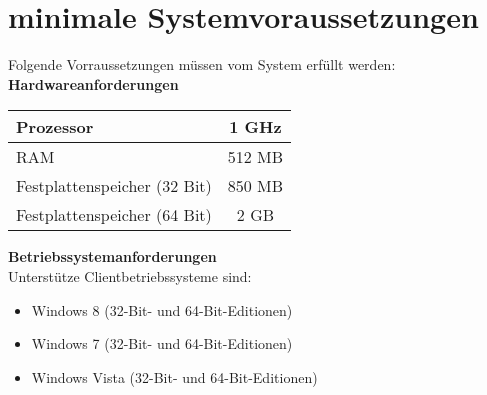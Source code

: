 \chapter{minimale Systemvoraussetzungen}
Folgende Vorraussetzungen müssen vom System erfüllt werden:\\
\textbf{Hardwareanforderungen}
\begin{center}
\begin{tabular}{ | l | c |}\hline 
Prozessor & 1 GHz \\ \hline
RAM & 512 MB \\ \hline
Festplattenspeicher (32 Bit) & 850 MB \\ \hline
Festplattenspeicher (64 Bit) & 2 GB \\ \hline
\end{tabular}
\end{center}
\textbf{Betriebssystemanforderungen} \\
Unterstütze Clientbetriebssysteme sind:
\begin{itemize}
\item Windows 8 (32-Bit- und 64-Bit-Editionen)
\item Windows 7 (32-Bit- und 64-Bit-Editionen)
\item Windows Vista (32-Bit- und 64-Bit-Editionen)
\end{itemize}